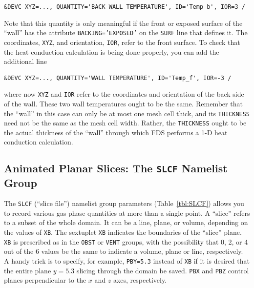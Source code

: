 \documentclass[11pt]{book}
\newcommand{\ct}{\tt\small}
\begin{document}
\footnotesize
\begin{verbatim}
&DEVC XYZ=..., QUANTITY='BACK WALL TEMPERATURE', ID='Temp_b', IOR=3 /
\end{verbatim} \normalsize

\noindent
Note that this quantity is only meaningful if the front or exposed surface of the ``wall'' has
the attribute {\ct BACKING='EXPOSED'} on the {\ct SURF} line that defines it. The coordinates, {\ct XYZ}, and orientation, {\ct IOR}, refer to
the front surface. To check that the heat conduction calculation is being done properly, you can add the additional line

\footnotesize
\begin{verbatim}
&DEVC XYZ=..., QUANTITY='WALL TEMPERATURE', ID='Temp_f', IOR=-3 /
\end{verbatim} \normalsize

\noindent
where now {\ct XYZ} and {\ct IOR} refer to the coordinates and orientation of the back side of the wall. These two wall temperatures ought to be
the same. Remember that the ``wall'' in this case can only be at most one mesh cell thick, and its {\ct THICKNESS} need not be the same as the
mesh cell width. Rather, the {\ct THICKNESS} ought to be the actual thickness of the ``wall'' through which FDS performs a 1-D heat conduction
calculation.





\subsection{Animated Planar Slices: The \texorpdfstring{{\tt SLCF}}{SLCF} Namelist Group}
\label{info:SLCF}

The {\ct SLCF} (``slice file'') namelist group parameters (Table~\ref{tbl:SLCF})
allows you to record various gas phase quantities
at more than a single point. A ``slice'' refers to a subset of the whole domain. It can be a line,
plane, or volume, depending on the values of {\ct XB}.
The sextuplet {\ct XB} indicates the boundaries of the ``slice'' plane.
{\ct XB} is prescribed as in the {\ct OBST} or {\ct VENT} groups, with
the possibility that 0, 2, or 4 out of the 6 values be the same to
indicate a volume, plane or line, respectively. A handy trick is to
specify, for example, {\ct PBY=5.3} instead of {\ct XB} if it is desired
that the entire plane $y=5.3$ slicing through the domain be saved.
{\ct PBX} and {\ct PBZ} control planes perpendicular to the
$x$ and $z$ axes, respectively.
\end{document}
